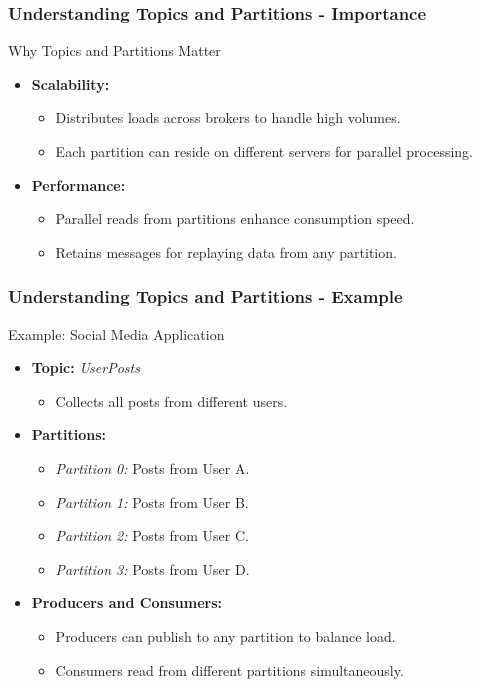 \documentclass[aspectratio=169]{beamer}
\begin{document}
\begin{frame}[fragile]
    \frametitle{Understanding Topics and Partitions - Importance}
    \begin{block}{Why Topics and Partitions Matter}
        \begin{itemize}
            \item \textbf{Scalability:}
            \begin{itemize}
                \item Distributes loads across brokers to handle high volumes.
                \item Each partition can reside on different servers for parallel processing.
            \end{itemize}
            \item \textbf{Performance:}
            \begin{itemize}
                \item Parallel reads from partitions enhance consumption speed.
                \item Retains messages for replaying data from any partition.
            \end{itemize}
        \end{itemize}
    \end{block}
\end{frame}

\begin{frame}[fragile]
    \frametitle{Understanding Topics and Partitions - Example}
    \begin{block}{Example: Social Media Application}
        \begin{itemize}
            \item \textbf{Topic:} \textit{UserPosts}
            \begin{itemize}
                \item Collects all posts from different users.
            \end{itemize}
            \item \textbf{Partitions:}
            \begin{itemize}
                \item \textit{Partition 0:} Posts from User A.
                \item \textit{Partition 1:} Posts from User B.
                \item \textit{Partition 2:} Posts from User C.
                \item \textit{Partition 3:} Posts from User D.
            \end{itemize}
            \item \textbf{Producers and Consumers:}
            \begin{itemize}
                \item Producers can publish to any partition to balance load.
                \item Consumers read from different partitions simultaneously.
            \end{itemize}
        \end{itemize}
    \end{block}
\end{frame}
\end{document}
